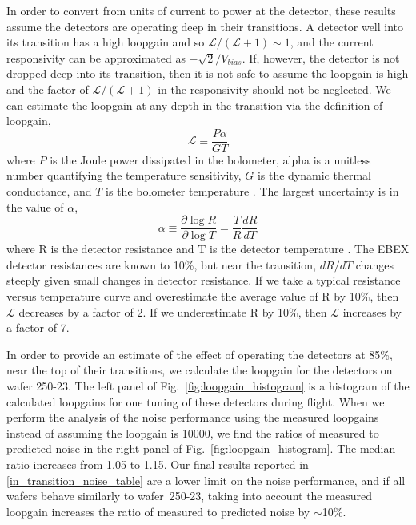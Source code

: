 In order to convert from units of current to power at the detector, these results assume the detectors are operating deep in their transitions. 
A detector well into its transition has a high loopgain and so $\mathcal{L}/(\mathcal{L} + 1) \sim 1$, and the current responsivity can be approximated as $-\sqrt{2}/V_{bias}$. 
If, however, the detector is not dropped deep into its transition, then it is not safe to assume the loopgain is high and the factor of  $\mathcal{L}/(\mathcal{L} + 1)$ in the responsivity should not be neglected. 
We can estimate the loopgain at any depth in the transition via the definition of loopgain, 
\begin{equation}
\mathcal{L} \equiv \frac{P\alpha}{GT}
\end{equation}
where $P$ is the Joule power dissipated in the bolometer, alpha is a unitless number quantifying the temperature sensitivity, $G$ is the dynamic thermal conductance, and $T$ is the bolometer temperature \citep{irwin_book_2005}. 
The largest uncertainty is in the value of $\alpha$, 
 \begin{equation}
 \alpha \equiv \frac{\partial \log R}{\partial \log T}=\frac{T}{R} \frac{dR}{dT}
 \end{equation}
 where R is the detector resistance and T is the detector temperature \citep{irwin_book_2005}. 
The \ac{EBEX} detector resistances are known to 10\%, but near the transition, $dR/dT$ changes steeply given small changes in detector resistance. 
If we take a typical resistance versus temperature curve and overestimate the average value of R by 10\%, then $\mathcal{L}$ decreases by a factor of 2.
If we underestimate R by 10\%, then $\mathcal{L}$ increases by a factor of 7. 

In order to provide an estimate of the effect of operating the detectors at 85\%, near the top of their transitions, we calculate the loopgain for the detectors on wafer 250-23. 
The left panel of Fig.~\ref{fig:loopgain_histogram} is a histogram of the calculated loopgains for one tuning of these detectors during flight. 
When we perform the analysis of the noise performance using the measured loopgains instead of assuming the loopgain is 10000, we find the ratios of measured to predicted noise in the right panel of Fig.~\ref{fig:loopgain_histogram}. 
The median ratio increases from 1.05 to 1.15. 
Our final results reported in \TAB\ref{in_transition_noise_table} are a lower limit on the noise performance, and if all wafers behave similarly to wafer~250-23, taking into account the measured loopgain increases the ratio of measured to predicted noise by $\sim$10\%. 


